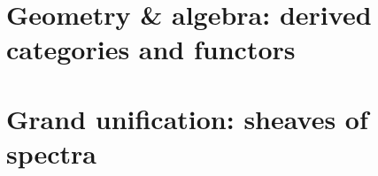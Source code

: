 
\section{Geometry \& algebra: derived categories and functors}
\label{geometry}


\section{Grand unification: sheaves of spectra}
\label{unify}


% 
% 


